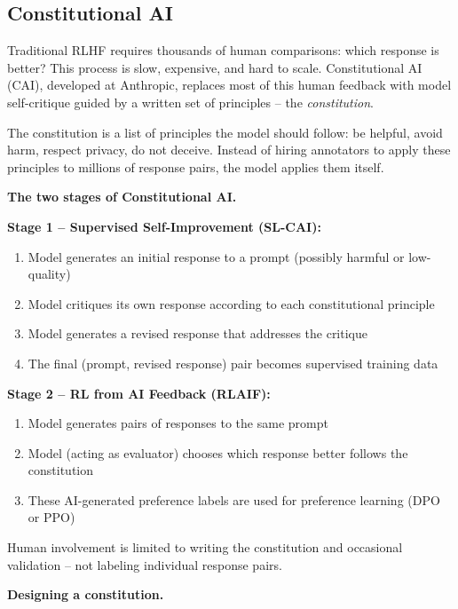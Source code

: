 \begin{chapterenv}
\section{Constitutional AI}

Traditional RLHF requires thousands of human comparisons: which response is better? This process is slow, expensive, and hard to scale. Constitutional AI (CAI), developed at Anthropic, replaces most of this human feedback with model self-critique guided by a written set of principles -- the \textit{constitution}.

The constitution is a list of principles the model should follow: be helpful, avoid harm, respect privacy, do not deceive. Instead of hiring annotators to apply these principles to millions of response pairs, the model applies them itself.

\begin{infobox}
\textbf{The two stages of Constitutional AI.}

\textbf{Stage 1 -- Supervised Self-Improvement (SL-CAI):}
\begin{enumerate}
\item Model generates an initial response to a prompt (possibly harmful or low-quality)
\item Model critiques its own response according to each constitutional principle
\item Model generates a revised response that addresses the critique
\item The final (prompt, revised response) pair becomes supervised training data
\end{enumerate}

\textbf{Stage 2 -- RL from AI Feedback (RLAIF):}
\begin{enumerate}
\item Model generates pairs of responses to the same prompt
\item Model (acting as evaluator) chooses which response better follows the constitution
\item These AI-generated preference labels are used for preference learning (DPO or PPO)
\end{enumerate}

Human involvement is limited to writing the constitution and occasional validation -- not labeling individual response pairs.
\end{infobox}

\begin{tipbox}
\textbf{Designing a constitution.}


\end{tipbox}
\end{chapterenv}
